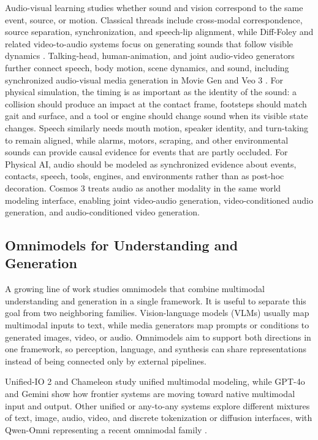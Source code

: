 Audio-visual learning studies whether sound and vision correspond to the same event, source, or motion.
Classical threads include cross-modal correspondence, source separation, synchronization, and speech-lip alignment, while Diff-Foley \citep{luo2023difffoley} and related video-to-audio systems focus on generating sounds that follow visible dynamics \citep{owens2018audiovisual,zhao2018sound,ephrat2018looking,chung2016out,prajwal2020wav2lip,comunita2023syncfusion,zhang2024foleycrafter,ren2024stav2a,gramaccioni2024stablev2a,mmaudio,klingfoley}.
Talking-head, human-animation, and joint audio-video generators further connect speech, body motion, scene dynamics, and sound, including synchronized audio-visual media generation in Movie Gen \citep{polyak2024movie} and Veo 3 \citep{veo3,vasa1,emo,hallo,omnihuman,xing2024seeing,ruan2022mmdiffusion,wang2024avdit,liu2024syncflow,li2025threemdit,hacohen2026ltx2,liu2025javisditt}.
For physical simulation, the timing is as important as the identity of the sound: a collision should produce an impact at the contact frame, footsteps should match gait and surface, and a tool or engine should change sound when its visible state changes.
Speech similarly needs mouth motion, speaker identity, and turn-taking to remain aligned, while alarms, motors, scraping, and other environmental sounds can provide causal evidence for events that are partly occluded.
For Physical AI, audio should be modeled as synchronized evidence about events, contacts, speech, tools, engines, and environments rather than as post-hoc decoration.
Cosmos 3 treats audio as another modality in the same world modeling interface, enabling joint video-audio generation, video-conditioned audio generation, and audio-conditioned video generation.

\subsection{Omnimodels for Understanding and Generation}
A growing line of work studies omnimodels that combine multimodal understanding and generation in a single framework.
It is useful to separate this goal from two neighboring families.
Vision-language models (VLMs) usually map multimodal inputs to text, while media generators map prompts or conditions to generated images, video, or audio.
Omnimodels aim to support both directions in one framework, so perception, language, and synthesis can share representations instead of being connected only by external pipelines.

Unified-IO 2 \citep{lu2023unifiedio2} and Chameleon \citep{chameleon2024} study unified multimodal modeling, while GPT-4o \citep{openai2024gpt4o} and Gemini \citep{gemini2,gemini3} show how frontier systems are moving toward native multimodal input and output.
Other unified or any-to-any systems explore different mixtures of text, image, audio, video, and discrete tokenization or diffusion interfaces, with Qwen-Omni \citep{xu2025qwen3omni,qwen35omni} representing a recent omnimodal family \citep{tang2023codi,wu2023nextgpt,anygpt,seedx,fourm,xie2024showo,chen2025januspro,emu3}.

